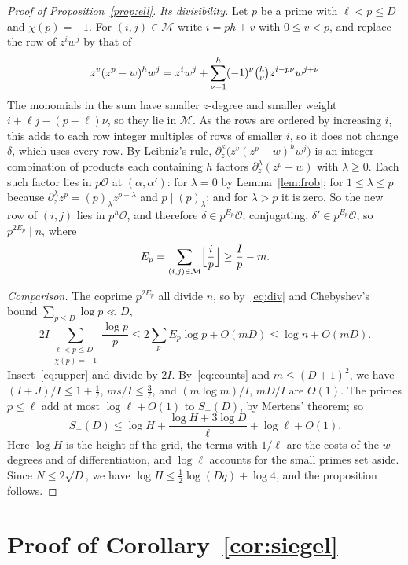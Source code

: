 \documentclass[11pt]{amsart}
\newcommand{\cO}{\mathcal{O}}
\newcommand{\cM}{\mathcal{M}}
\begin{document}
\begin{proof}[Proof of Proposition~\ref{prop:ell}]
\emph{Its divisibility.} Let $p$ be a prime with $\ell<p\le D$ and $\chi(p)=-1$. For $(i,j)\in\cM$
write $i=ph+v$ with $0\le v<p$, and replace the row of $z^iw^j$ by that of
\[
z^v(z^p-w)^hw^j=z^iw^j+\sum_{\nu=1}^{h}(-1)^\nu\tbinom h\nu z^{i-p\nu}w^{j+\nu}
\]
The monomials in the sum have smaller $z$-degree and smaller weight
$i+\ell j-(p-\ell)\nu$, so they lie in $\cM$. As the rows are ordered by increasing $i$, this adds to each row integer
multiples of rows of smaller $i$, so it does not change $\delta$, which uses every row. By Leibniz's rule,
$\partial_z^\kappa\bigl(z^v(z^p-w)^hw^j\bigr)$ is an integer combination of products each containing
$h$ factors $\partial_z^\lambda(z^p-w)$ with $\lambda\ge0$. Each such factor lies in $p\cO$ at
$(\alpha,\alpha')$: for $\lambda=0$ by Lemma~\ref{lem:frob}; for $1\le\lambda\le p$ because
$\partial_z^\lambda z^p=(p)_\lambda z^{p-\lambda}$ and $p\mid(p)_\lambda$; and for $\lambda>p$ it is
zero. So the
new row of $(i,j)$ lies in $p^h\cO$, and therefore $\delta\in p^{E_p}\cO$; conjugating, $\delta'\in p^{E_p}\cO$, so $p^{2E_p}\mid n$, where
\begin{equation}\label{eq:div}
E_p=\sum_{(i,j)\in\cM}\Bigl\lfloor\frac ip\Bigr\rfloor\ge\frac Ip-m.
\end{equation}

\emph{Comparison.} The coprime $p^{2E_p}$ all divide $n$, so by~\eqref{eq:div} and Chebyshev's bound
$\sum_{p\le D}\log p\ll D$,
\[
2I\sum_{\substack{\ell<p\le D\\ \chi(p)=-1}}\frac{\log p}p\le2\sum_pE_p\log p+O(mD)\le\log n+O(mD).
\]
Insert~\eqref{eq:upper} and divide by $2I$. By~\eqref{eq:counts} and $m\le(D+1)^2$, we have
$(I+J)/I\le1+\frac1\ell$, $ms/I\le\frac3\ell$, and $(m\log m)/I$, $mD/I$ are $O(1)$. The
primes $p\le\ell$ add at most $\log\ell+O(1)$ to $S_-(D)$, by Mertens' theorem; so
\[
S_-(D)\le\log H+\frac{\log H+3\log D}{\ell}+\log\ell+O(1).
\]
Here $\log H$ is the height of the grid, the terms with $1/\ell$ are the costs of the $w$-degrees and
of differentiation, and $\log\ell$ accounts for the small primes set aside. Since $N\le2\sqrt D$, we
have $\log H\le\frac12\log(Dq)+\log4$, and the proposition follows.
\end{proof}

\section{Proof of Corollary~\ref{cor:siegel}}\label{sec:cor}
\end{document}

